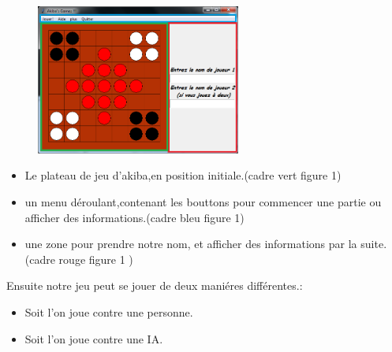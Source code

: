 \documentclass{article}
\begin{document}
\vspace{0.5cm}
\begin{figure}[!h]
\centerline{\includegraphics[width=0.6\textwidth]{images/fenetre_debut.png}}
\vspace{0.5cm}
\caption{}
\end{figure}

\begin{itemize}
\item Le plateau de jeu d'akiba,en position initiale.(cadre vert figure 1)
\item un menu déroulant,contenant les bouttons pour commencer une partie ou afficher des informations.(cadre bleu figure 1)
\item une zone pour prendre notre nom, et afficher des informations par la suite.(cadre rouge figure 1 )
\end{itemize}
\vspace{0.25cm}
Ensuite notre jeu peut se jouer de deux maniéres différentes.:
\begin{itemize}
\item Soit l'on joue contre une personne.
\item Soit l'on joue contre une IA.
\end{itemize}
\vspace{0.5cm}
\end{document}
